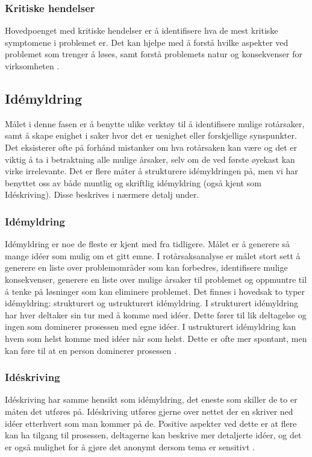 \subsubsection{Kritiske hendelser}
Hovedpoenget med kritiske hendelser er å identifisere hva de mest kritiske symptomene i problemet er. Det kan hjelpe med å forstå hvilke aspekter ved problemet som trenger å løses, samt forstå problemets natur og konsekvenser for virksomheten \cite{RCA}. 

\subsection{Idémyldring}
Målet i denne fasen er å benytte ulike verktøy til å identifisere mulige rotårsaker, samt å skape enighet i saker hvor det er uenighet eller forskjellige synspunkter. Det eksisterer ofte på forhånd mistanker om hva rotårsaken kan være og det er viktig å ta i betraktning alle mulige årsaker, selv om de ved første øyekast kan virke irrelevante. Det er flere måter å strukturere idémyldringen på, men vi har benyttet oss av både muntlig og skriftlig idémyldring (også kjent som Idéskriving). Disse beskrives i nærmere detalj under. 

\subsubsection{Idémyldring}
Idémyldring er noe de fleste er kjent med fra tidligere. Målet er å generere så mange idéer som mulig om et gitt emne. I rotårsaksanalyse er målet stort sett å generere en liste over problemområder som kan forbedres, identifisere mulige konsekvenser, generere en liste over mulige årsaker til problemet og oppmuntre til å tenke på løsninger som kan eliminere problemet. Det finnes i hovedsak to typer idémyldring: strukturert og ustrukturert idémyldring. I strukturert idémyldring har hver deltaker sin tur med å komme med idéer. Dette fører til lik deltagelse og ingen som dominerer prosessen med egne idéer. I ustrukturert idémyldring kan hvem som helst komme med idéer når som helst. Dette er ofte mer spontant, men kan føre til at en person dominerer prosessen \cite{RCA}. 

\subsubsection{Idéskriving}
Idéskriving har samme hensikt som idémyldring, det eneste som skiller de to er måten det utføres på. Idéskriving utføres gjerne over nettet der en skriver ned idéer etterhvert som man kommer på de. Positive aspekter ved dette er at flere kan ha tilgang til prosessen, deltagerne kan beskrive mer detaljerte idéer, og det er også mulighet for å gjøre det anonymt dersom tema er sensitivt \cite{RCA}. 

